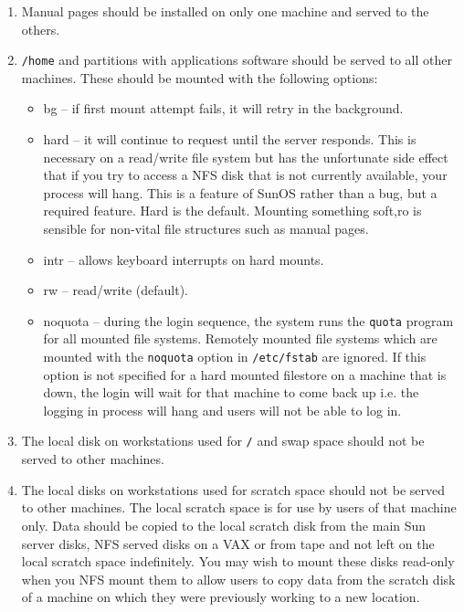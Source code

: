 \begin{enumerate}

\item Manual pages should be installed on only one machine and served to the 
others.

\item {\tt /home} and partitions with applications software should be served to 
all other machines. These should be mounted with the following options:

\begin{itemize}

\item bg -- if first mount attempt fails, it will retry in the background.

\item hard -- it will continue to request until the server responds.
This is necessary on a read/write file system but has the unfortunate
side effect that if you try to access a NFS disk that is not currently
available, your process will hang. This is a feature of SunOS 
rather than a bug, but a required feature. Hard is the default.
Mounting something soft,ro is sensible for non-vital file structures
such as manual pages.

\item intr -- allows keyboard interrupts on hard mounts.

\item rw -- read/write (default).

\item noquota -- during the login sequence, the system runs the {\tt quota}
program for all mounted file systems. Remotely mounted file systems which are
mounted with the {\tt noquota} option in {\tt /etc/fstab} are ignored. If this
option is not specified for a hard mounted filestore on a machine that is
down, the login will wait for that machine to come back up i.e. the logging
in process will hang and users will not be able to log in.

\end{itemize}

\item The local disk on workstations used for {\tt /} and swap space should
not be served to other machines.

\item The local disks on workstations used for scratch space should 
not be served to other machines. The local scratch space is for use
by users of that machine only. Data should be copied to the local
scratch disk from the main Sun server disks, NFS served disks on a VAX or
from tape and not left on the local scratch space indefinitely. You may wish to
mount these 
disks read-only when you NFS mount them to allow users to copy data from the
scratch disk of a machine on which they were previously working to a new
location.

\end{enumerate}

